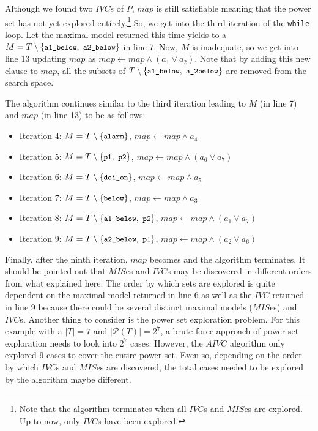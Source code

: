 Although we found two $IVC$s of $P$, $map$ is still satisfiable meaning that the power set has not yet explored entirely.\footnote{Note that the algorithm terminates when all $IVC$s and $MIS$es are explored. Up to now, only $IVC$s have been explored.} So, we get into the third iteration of the \texttt{while} loop. Let the maximal model returned this time
yields to a
$M = T \setminus \{ \small{ \texttt{a1\_below},~\texttt{a2\_below}}\}$
 in line 7.
Now, $M$ is inadequate, so we get into line 13 updating $map$ as
$map \leftarrow map \wedge (a_1 \vee a_2)$.
Note that by adding this new clause to $map$,
all the subsets of $T \setminus \{ \small{ \texttt{a1\_below},~\texttt{a\_2below}}\}$
are removed from the search space.

The algorithm continues similar to the third iteration leading to $M$ (in line 7) and $map$ (in line 13) to be as follows:
\begin{itemize}
  \item Iteration 4:  $M = T \setminus \{ \small{ \texttt{alarm}}\}$, $map \leftarrow map \wedge a_4$

  \item Iteration 5: $M = T \setminus \{ \small{ \texttt{p1},~\texttt{p2}}\}$, $map \leftarrow map \wedge (a_6 \vee a_7)$

  \item Iteration 6: $M = T \setminus \{ \small{ \texttt{doi\_on}}\}$, $map \leftarrow map \wedge a_5$

  \item Iteration 7: $M = T \setminus \{ \small{ \texttt{below}}\}$, $map \leftarrow map \wedge a_3$

  \item Iteration 8: $M = T \setminus \{ \small{ \texttt{a1\_below},~\texttt{p2}}\}$, $map \leftarrow map \wedge (a_1 \vee a_7)$

  \item Iteration 9: $M = T \setminus \{ \small{ \texttt{a2\_below},~\texttt{p1}}\}$, $map \leftarrow map \wedge (a_2 \vee a_6)$
\end{itemize}
Finally, after the ninth iteration, $map$ becomes \unsat and the algorithm terminates.
It should be pointed out that $MIS$es and $IVC$s may be discovered in different orders from what explained here. The order by which sets are explored is
quite dependent on the maximal model returned in line 6 as well as the $IVC$ returned in line 9 because there could be several distinct maximal models ($MIS$es) and $IVC$s. Another thing to consider is the power set exploration problem. For this example with a $|T| = 7$ and $|\mathcal{P}(T)| = 2^7$, a brute force approach of power set exploration needs to look into  $2^7$ cases. However, the $AIVC$ algorithm only explored 9 cases to cover the entire power set. Even so, depending on the order by which $IVC$s and $MIS$es are discovered, the total cases needed to be explored by the algorithm maybe different.

